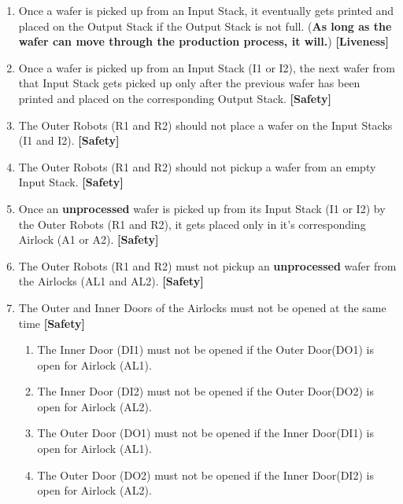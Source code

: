 \documentclass[a4paper,12pt]{article}
\begin{document}
\begin{enumerate}
\item Once a wafer is picked up from an Input Stack, it eventually gets printed and placed on the Output Stack if the Output Stack is not full. (\textbf{As long as the wafer can move through the production process, it will.}) \textbf{[Liveness]}
\item Once a wafer is picked up from an Input Stack (I1 or I2), the next wafer from that Input Stack gets picked up only after the previous wafer has been printed and placed on the corresponding Output Stack. \textbf{[Safety]}
\item The Outer Robots (R1 and R2) should not place a wafer on the Input Stacks (I1 and I2). \textbf{[Safety]}
\item The Outer Robots (R1 and R2) should not pickup a wafer from an empty Input Stack. \textbf{[Safety]}
\item Once an \textbf{unprocessed} wafer is picked up from its Input Stack (I1 or I2) by the Outer Robots (R1 and R2), it gets placed only in it's corresponding Airlock (A1 or A2). \textbf{[Safety]}
\item The Outer Robots (R1 and R2) must not pickup an \textbf{unprocessed} wafer from the Airlocks (AL1 and AL2). \textbf{[Safety]}
\item The Outer and Inner Doors of the Airlocks must not be opened at the same time \textbf{[Safety]}
\begin{enumerate}
    \item The Inner Door (DI1) must not be opened if the Outer Door(DO1) is open for Airlock (AL1).

    \item The Inner Door (DI2) must not be opened if the Outer Door(DO2) is open for Airlock (AL2).

    \item The Outer Door (DO1) must not be opened if the Inner Door(DI1) is open for Airlock (AL1).

    \item The Outer Door (DO2) must not be opened if the Inner Door(DI2) is open for Airlock (AL2).


\end{enumerate}
\end{enumerate}
\end{document}
